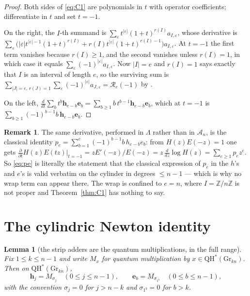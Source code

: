 \documentclass[11pt]{article}
\theoremstyle{plain}
\newtheorem{lemma}[theorem]{Lemma}
\theoremstyle{definition}
\newtheorem{remark}[theorem]{Remark}
\newcommand{\A}{\mathscr{A}}
\newcommand{\QH}{\mathrm{QH}^*}
\newcommand{\Gr}{\mathrm{Gr}}
\newcommand{\ZZ}{\mathbb{Z}}
\newcommand{\Lam}{\Lambda}
\newcommand{\bh}{\mathbf h}
\newcommand{\be}{\mathbf e}
\begin{document}
\begin{proof}
Both sides of \eqref{eq:C1} are polynomials in $t$ with operator coefficients;
differentiate in $t$ and set $t=-1$.

On the right, the $I$-th summand is
$\sum_\varepsilon t^{|\varepsilon|}(1+t)^{r(I)}a_{I,\varepsilon}$, whose
derivative is
$\sum_\varepsilon\bigl(|\varepsilon|t^{|\varepsilon|-1}(1+t)^{r(I)}
+r(I)t^{|\varepsilon|}(1+t)^{r(I)-1}\bigr)a_{I,\varepsilon}$.  At $t=-1$ the
first term vanishes because $r(I)\ge1$, and the second vanishes unless
$r(I)=1$, in which case it equals
$\sum_\varepsilon(-1)^{|\varepsilon|}a_{I,\varepsilon}$.  Now $|I|=e$ and
$r(I)=1$ says exactly that $I$ is an interval of length $e$, so the surviving
sum is $\sum_{|J|=e,\,r(J)=1}\sum_\varepsilon(-1)^{|\varepsilon|}a_{J,\varepsilon}
=\mathcal R_e(-1)$ by \cite[\texttt{thm:A}]{Clio201}.

On the left, $\frac{d}{dt}\sum_b t^b\bh_{e-b}\be_b
=\sum_{b\ge1}b\,t^{b-1}\bh_{e-b}\be_b$, which at $t=-1$ is
$\sum_{b\ge1}(-1)^{b-1}b\,\bh_{e-b}\be_b$.
\end{proof}

\begin{remark}
The same derivative, performed in $\Lam$ rather than in $\A_n$, is the classical
identity $p_e=\sum_{b=1}^{e}(-1)^{b-1}b\,h_{e-b}e_b$: from $H(z)E(-z)=1$ one
gets $\frac{\partial}{\partial t}H(z)E(tz)\bigr|_{t=-1}=zE'(-z)/E(-z)
=z\,\frac{d}{dz}\log H(z)=\sum_{e\ge1}p_ez^{e}$.  So \eqref{eq:pe} is literally
the statement that the classical expression of $p_e$ in the $h$'s and $e$'s is
valid verbatim on the cylinder in degrees $\le n-1$ --- which is why no wrap
term can appear there.  The wrap is confined to $e=n$, where $I=\ZZ/n\ZZ$ is not
proper and Theorem~\ref{thm:C1} has nothing to say.
\end{remark}

\section{The cylindric Newton identity}

\begin{lemma}[the strip adders are the quantum multiplications, in the full
range]\label{lem:mult}
Fix $1\le k\le n-1$ and write $M_x$ for quantum multiplication by
$x\in\QH(\Gr_{kn})$.  Then on $\QH(\Gr_{kn})$,
\[
\bh_j=M_{\sigma_j}\quad(0\le j\le n-1),
\qquad
\be_b=M_{\sigma_{1^b}}\quad(0\le b\le n-1),
\]
with the convention $\sigma_j=0$ for $j>n-k$ and $\sigma_{1^b}=0$ for $b>k$.
\end{lemma}
\end{document}
